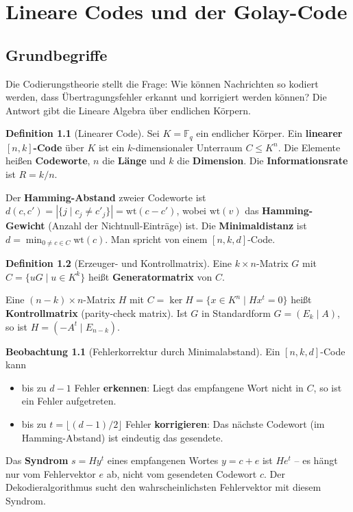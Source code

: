 ﻿\documentclass[a4paper,12pt]{report}
\theoremstyle{definition}
\newtheorem{definition}{Definition}
\newtheorem{beobachtung}{Beobachtung}
\begin{document}
\chapter{Lineare Codes und der Golay-Code}

\section{Grundbegriffe}

Die Codierungstheorie stellt die Frage: Wie können Nachrichten so kodiert
werden, dass Übertragungsfehler erkannt und korrigiert werden können?
Die Antwort gibt die Lineare Algebra über endlichen Körpern.

\begin{definition}[Linearer Code]
    Sei $K = \mathbb{F}_q$ ein endlicher Körper. Ein \textbf{linearer
    $[n, k]$-Code} über $K$ ist ein $k$-dimensionaler Unterraum
    $C \leq K^n$. Die Elemente heißen \textbf{Codeworte},
    $n$ die \textbf{Länge} und $k$ die \textbf{Dimension}.
    Die \textbf{Informationsrate} ist $R = k/n$.

    Der \textbf{Hamming-Abstand} zweier Codeworte ist
    $d(c, c') = |\{j \mid c_j \neq c'_j\}| = \mathrm{wt}(c - c')$,
    wobei $\mathrm{wt}(v)$ das \textbf{Hamming-Gewicht} (Anzahl der
    Nichtnull-Einträge) ist.
    Die \textbf{Minimaldistanz} ist $d = \min_{0 \neq c \in C} \mathrm{wt}(c)$.
    Man spricht von einem $[n, k, d]$-Code.
\end{definition}

\begin{definition}[Erzeuger- und Kontrollmatrix]
    Eine $k \times n$-Matrix $G$ mit $C = \{uG \mid u \in K^k\}$
    heißt \textbf{Generatormatrix} von $C$.

    Eine $(n-k) \times n$-Matrix $H$ mit $C = \ker H = \{x \in K^n \mid Hx^t = 0\}$
    heißt \textbf{Kontrollmatrix} (parity-check matrix).
    Ist $G$ in Standardform $G = (E_k \mid A)$, so ist $H = (-A^t \mid E_{n-k})$.
\end{definition}

\begin{beobachtung}[Fehlerkorrektur durch Minimalabstand]
    Ein $[n,k,d]$-Code kann
    \begin{itemize}
        \item[-] bis zu $d-1$ Fehler \textbf{erkennen}: Liegt das empfangene Wort
              nicht in $C$, so ist ein Fehler aufgetreten.
        \item[-] bis zu $t = \lfloor(d-1)/2\rfloor$ Fehler \textbf{korrigieren}:
              Das nächste Codewort (im Hamming-Abstand) ist eindeutig das gesendete.
    \end{itemize}
    Das \textbf{Syndrom} $s = Hy^t$ eines empfangenen Wortes $y = c + e$
    ist $He^t$ -- es hängt nur vom Fehlervektor $e$ ab, nicht vom
    gesendeten Codewort $c$. Der Dekodieralgorithmus sucht den
    wahrscheinlichsten Fehlervektor mit diesem Syndrom.
\end{beobachtung}
\end{document}
